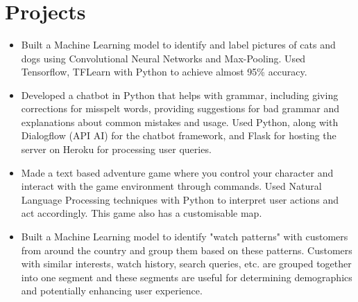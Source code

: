 \documentclass[]{deedy-resume-openfont}
\begin{document}
\begin{minipage}[]{1\textwidth} 
\hfill \\
\hfill \\
\hfill \\
\section{Projects} 
\vspace{0.2cm}
\begin{tightemize}
\item {}
\begin{itemize}
\item \normalsize Built a Machine Learning model to identify and label pictures of cats and dogs using Convolutional Neural Networks and Max-Pooling. Used Tensorflow, TFLearn with Python to achieve almost 95\% accuracy.
\end{itemize}
\item {}
\begin{itemize}
\item \normalsize Developed a chatbot in Python that helps with grammar, including giving corrections for misspelt words, providing suggestions for bad grammar and explanations about common mistakes and usage. Used Python, along with Dialogflow (API AI) for the chatbot framework, and Flask for hosting the server on Heroku for processing user queries.
\end{itemize}
\item {}
\begin{itemize}
\item \normalsize Made a text based adventure game where you control your character and interact with the game environment through commands. Used Natural Language Processing techniques with Python to interpret user actions and act accordingly. This game also has a customisable map.
\end{itemize}
\item {}
\begin{itemize}
\item \normalsize Built a Machine Learning model to identify "watch patterns" with customers from around the country and group them based on these patterns. Customers with similar interests, watch history, search queries, etc. are grouped together into one segment and these segments are useful for determining demographics and potentially enhancing user experience. 

\end{itemize}
\end{tightemize}
\end{minipage}
\end{document}

